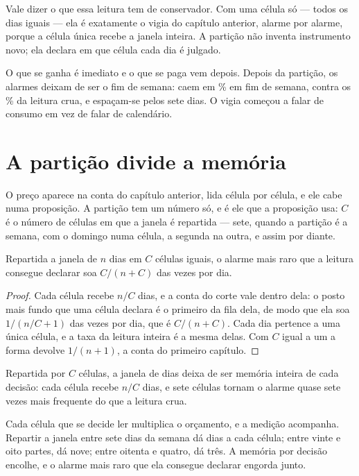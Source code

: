 Vale dizer o que essa leitura tem de conservador. Com uma célula só --- todos os dias iguais
--- ela é exatamente o vigia do capítulo anterior, alarme por alarme, porque a célula única
recebe a janela inteira. A partição não inventa instrumento novo; ela declara em que célula
cada dia é julgado.

O que se ganha é imediato e o que se paga vem depois. Depois da partição, os alarmes deixam de
ser o fim de semana: caem em \numCalendarioSemanaFimDeSemanaPct\% em fim de semana, contra os
\numCalendarioCruFimDeSemanaPct\% da leitura crua, e espaçam-se pelos sete dias. O vigia
começou a falar de consumo em vez de falar de calendário.

\section{A partição divide a memória}

O preço aparece na conta do capítulo anterior, lida célula por célula, e ele cabe numa
proposição.
A partição tem um número só, e é ele que a proposição usa: $C$ é o número de células em que a
janela é repartida --- sete, quando a partição é a semana, com o domingo numa célula, a segunda
na outra, e assim por diante.

\begin{proposicao}\label{prop:particao}
Repartida a janela de $n$ dias em $C$ células iguais, o alarme mais raro que a leitura consegue
declarar soa $C/(n+C)$ das vezes por dia.
\end{proposicao}

\begin{proof}
Cada célula recebe $n/C$ dias, e a conta do corte vale dentro dela: o posto mais fundo que uma
célula declara é o primeiro da fila dela, de modo que ela soa $1/(n/C + 1)$ das vezes por dia, que
é $C/(n+C)$. Cada dia pertence a uma única célula, e a taxa da leitura inteira é a mesma delas.
Com $C$ igual a um a forma devolve $1/(n+1)$, a conta do primeiro capítulo.
\end{proof}

Repartida por $C$ células, a janela de \numCalendarioJanela{} dias deixa de ser memória inteira de
cada decisão: cada célula recebe $n/C$ dias, e sete células tornam o alarme quase sete vezes mais
frequente do que a leitura crua.

Cada célula que se decide ler multiplica o orçamento, e a medição acompanha. Repartir a janela
entre sete dias da semana dá 
\numCalendarioSemanaDiasPorCelula{} dias a cada célula; entre vinte
e oito partes, dá nove; entre oitenta e quatro, dá três. A memória por decisão encolhe, e o
alarme mais raro que ela consegue declarar engorda junto.

